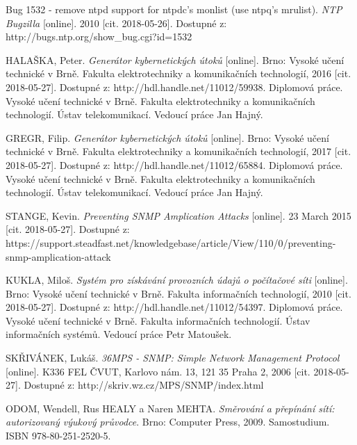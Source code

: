 \begin{literatura}{99}
Bug 1532 - remove ntpd support for ntpdc's monlist (use ntpq's mrulist). \textit{NTP Bugzilla} [online]. 2010 [cit. 2018-05-26]. Dostupné z: http://bugs.ntp.org/show\_bug.cgi?id=1532

HALAŠKA, Peter. \textit{Generátor kybernetických útoků} [online]. Brno: Vysoké učení technické v Brně. Fakulta elektrotechniky a komunikačních technologií, 2016 [cit. 2018-05-27]. Dostupné z: http://hdl.handle.net/11012/59938. Diplomová práce. Vysoké učení technické v Brně. Fakulta elektrotechniky a komunikačních technologií. Ústav telekomunikací. Vedoucí práce Jan Hajný.

GREGR, Filip. \textit{Generátor kybernetických útoků} [online]. Brno: Vysoké učení technické v Brně. Fakulta elektrotechniky a komunikačních technologií, 2017 [cit. 2018-05-27]. Dostupné z: http://hdl.handle.net/11012/65884. Diplomová práce. Vysoké učení technické v Brně. Fakulta elektrotechniky a komunikačních technologií. Ústav telekomunikací. Vedoucí práce Jan Hajný.

STANGE, Kevin. \textit{Preventing SNMP Amplication Attacks} [online]. 23 March 2015 [cit. 2018-05-27]. Dostupné z: https://support.steadfast.net/knowledgebase/article/View/110/0/preventing-snmp-amplication-attack

KUKLA, Miloš. \textit{Systém pro získávání provozních údajů o počítačové síti} [online]. Brno: Vysoké učení technické v Brně. Fakulta informačních technologií, 2010 [cit. 2018-05-27]. Dostupné z: http://hdl.handle.net/11012/54397. Diplomová práce. Vysoké učení technické v Brně. Fakulta informačních technologií. Ústav informačních systémů. Vedoucí práce Petr Matoušek.

SKŘIVÁNEK, Lukáš. \textit{36MPS - SNMP: Simple Network Management Protocol} [online]. K336 FEL ČVUT, Karlovo nám. 13, 121 35 Praha 2, 2006 [cit. 2018-05-27]. Dostupné z: http://skriv.wz.cz/MPS/SNMP/index.html

ODOM, Wendell, Rus HEALY a Naren MEHTA. \textit{Směrování a přepínání sítí: autorizovaný výukový průvodce}. Brno: Computer Press, 2009. Samostudium. ISBN 978-80-251-2520-5.

\end{literatura}


%
%
%
